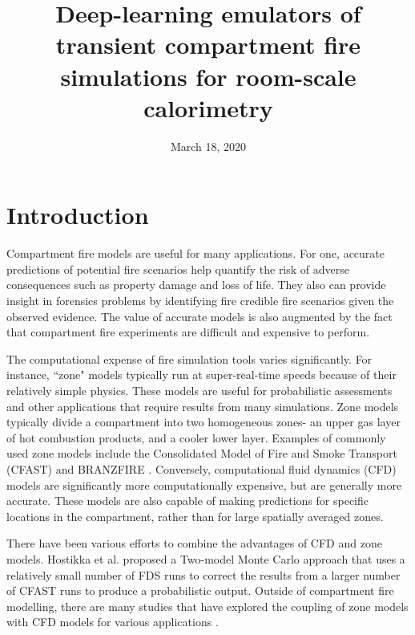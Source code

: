 \documentclass{article}
\begin{document}
\title{Deep-learning emulators of transient compartment fire simulations for room-scale calorimetry}




\author{}
\date{March 18, 2020} 

\maketitle

\begin{abstract}

\end{abstract}
\section{Introduction}
Compartment fire models are useful for many applications. For one, accurate predictions of potential fire scenarios help quantify the risk of adverse consequences such as property damage and loss of life. They also can provide insight in forensics problems by identifying fire credible fire scenarios given the observed evidence. The value of accurate models is also augmented by the fact that compartment fire experiments are difficult and expensive to perform. 

The computational expense of fire simulation tools varies significantly. For instance,  ``zone" models typically run at super-real-time speeds because of their relatively simple physics. These models are useful for probabilistic assessments \cite{anderson2018quantifying, baker2013developing} and other applications that require results from many simulations. Zone models typically divide a compartment into two homogeneous zones- an upper gas layer of hot combustion products, and a cooler lower layer. Examples of commonly used zone models include the Consolidated Model of Fire and Smoke Transport (CFAST) \cite{peacock1993cfast} and BRANZFIRE \cite{wade2000branzfire}. Conversely, computational fluid dynamics (CFD) models are significantly more computationally expensive, but are generally more accurate. These models are also capable of making predictions for specific locations in the compartment, rather than for large spatially averaged zones. 

There have been various efforts to combine the advantages of CFD and zone models. Hostikka et al. \cite{hostikka2005two} proposed a Two-model Monte Carlo approach that uses a relatively small number of FDS runs to correct the results from a larger number of CFAST runs to produce a probabilistic output. Outside of compartment fire modelling, there are many studies that have explored the coupling of zone models with CFD models for various applications \cite{dreng2008method, tan2005application, wang2007validation, colella2009calculation, floyd2011coupling, colella2011multiscale}.
\end{document}
